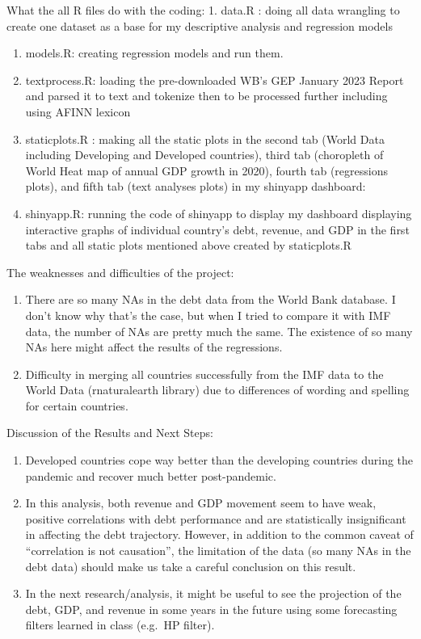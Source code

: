 \documentclass[
]{article}
\begin{document}
What the all R files do with the coding: 1. data.R : doing all data
wrangling to create one dataset as a base for my descriptive analysis
and regression models

\begin{enumerate}
\def\labelenumi{\arabic{enumi}.}
\setcounter{enumi}{1}
\item
  models.R: creating regression models and run them.
\item
  textprocess.R: loading the pre-downloaded WB's GEP January 2023 Report
  and parsed it to text and tokenize then to be processed further
  including using AFINN lexicon
\item
  staticplots.R : making all the static plots in the second tab (World
  Data including Developing and Developed countries), third tab
  (choropleth of World Heat map of annual GDP growth in 2020), fourth
  tab (regressions plots), and fifth tab (text analyses plots) in my
  shinyapp dashboard:
\item
  shinyapp.R: running the code of shinyapp to display my dashboard
  displaying interactive graphs of individual country's debt, revenue,
  and GDP in the first tabs and all static plots mentioned above created
  by staticplots.R
\end{enumerate}

The weaknesses and difficulties of the project:

\begin{enumerate}
\def\labelenumi{\arabic{enumi}.}
\item
  There are so many NAs in the debt data from the World Bank database. I
  don't know why that's the case, but when I tried to compare it with
  IMF data, the number of NAs are pretty much the same. The existence of
  so many NAs here might affect the results of the regressions.
\item
  Difficulty in merging all countries successfully from the IMF data to
  the World Data (rnaturalearth library) due to differences of wording
  and spelling for certain countries.
\end{enumerate}

Discussion of the Results and Next Steps:

\begin{enumerate}
\def\labelenumi{\arabic{enumi}.}
\item
  Developed countries cope way better than the developing countries
  during the pandemic and recover much better post-pandemic.
\item
  In this analysis, both revenue and GDP movement seem to have weak,
  positive correlations with debt performance and are statistically
  insignificant in affecting the debt trajectory. However, in addition
  to the common caveat of ``correlation is not causation'', the
  limitation of the data (so many NAs in the debt data) should make us
  take a careful conclusion on this result.
\item
  In the next research/analysis, it might be useful to see the
  projection of the debt, GDP, and revenue in some years in the future
  using some forecasting filters learned in class (e.g.~HP filter).
\end{enumerate}
\end{document}
